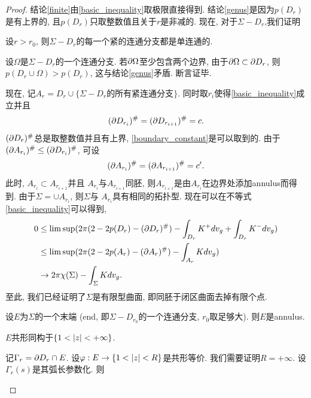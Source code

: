 \begin{proof}
    结论\eqref{finite}由\eqref{basic_inequality}取极限直接得到. 结论\eqref{genus}是因为$p(D_r)$是有上界的, 且$p(D_r)$只取整数值且关于$r$是非减的. 现在, 对于$\Sigma - D_r$,我们证明
    \begin{claim}
        设$r > r_0$, 则$\Sigma - D_r$的每一个紧的连通分支都是单连通的.
        \begin{subproof}
            设$\Omega$是$\Sigma - D_r$的一个连通分支. 若$\P \Omega$至少包含两个边界, 由于$\P \Omega \subset \P D_r$, 则$p(D_r \cup \Omega) > p(D_r)$, 这与结论\eqref{genus}矛盾. 断言证毕.
        \end{subproof}
    \end{claim}
    \par 现在, 记$A_r=D_r\cup \{\Sigma - D_r\text{的所有紧连通分支}\}$. 同时取$r_i$使得\eqref{basic_inequality}成立并且
    \begin{equation} \label{boundary_constant}
        (\P D_{r_i})^\# = (\P D_{r_{i+1}})^\#=c.
    \end{equation}
    $(\P D_{r})^\#$总是取整数值并且有上界, \eqref{boundary_constant}是可以取到的. 由于$(\P A_{r_i})^\# \le (\P D_{r_i})^\#$, 可设
    \begin{equation}
        (\P A_{r_i})^\# = (\P A_{r_{i+1}})^\#=c'.
    \end{equation}
    此时, $A_{r_i} \subset A_{r_{i+1}}$并且 $A_{r_i}$与$A_{r_{i+1}}$同胚, 则$A_{r_{i+1}}$是由$A_{r_i}$在边界处添加annulus而得到. 由于$\Sigma = \cup A_{r_i}$, 则$\Sigma$与 $A_{r_i}$具有相同的拓扑型. 现在可以在不等式\eqref{basic_inequality}可以得到,
    \begin{equation}
        \begin{split}
            0 & \le \limsup (2\pi(2-2p(D_r)-(\P D_r)^\#)-\int_{D_r}K^+dv_g+\int_{D_r}K^-dv_g) \\
            &\le  \limsup (2\pi(2-2p(A_r)-(\P A_r)^\#)-\int_{A_r}Kdv_g) \\
            & \to  2\pi \chi(\Sigma) - \int_\Sigma K dv_g.
        \end{split}
    \end{equation}
    至此, 我们已经证明了$\Sigma$是有限型曲面, 即同胚于闭区曲面去掉有限个点.
    \par 设$E$为$\Sigma$的一个末端 (end, 即$\Sigma-D_{r_0}$的一个连通分支, $r_0$取足够大). 则$E$是annulus. 
    \begin{claim}
        $E$共形同构于$\{1 < \abs{z} < +\infty\}$.
        \begin{subproof}
            记$\Gamma_r=\P D_r \cap E$. 设$\phi: E \to \{ 1 < \abs{z} < R\}$是共形等价. 我们需要证明$R=+\infty$. 设$\Gamma_r(s)$是其弧长参数化. 则

\end{subproof}
\end{claim}
\end{proof}
